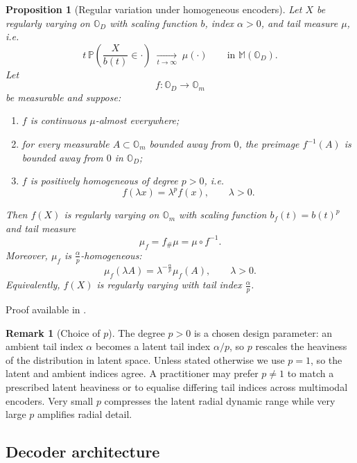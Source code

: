 \documentclass{article}
\newtheorem{proposition}[theorem]{Proposition}
\theoremstyle{definition}
\newtheorem{remark}[theorem]{Remark}
\begin{document}
\begin{proposition}[Regular variation under homogeneous encoders]
\label{prop:reg-variation-under-homogeneous-encoders}
Let \(X\) be regularly varying on \(\mathbb{O}_D\) with scaling function \(b\), index \(\alpha>0\), and tail measure \(\mu\), i.e.
\[
t\,\mathbb{P}\!\left(\frac{X}{b(t)} \in \cdot \right)
\;\xrightarrow[t\to\infty]{}\;
\mu(\cdot)
\qquad
\text{in } \mathbb{M}(\mathbb{O}_D).
\]
Let
\[
f:\mathbb{O}_D \to \mathbb{O}_m
\]
be measurable and suppose:
\begin{enumerate}
    \item \(f\) is continuous \(\mu\)-almost everywhere;
    \item for every measurable \(A \subset \mathbb{O}_m\) bounded away from \(0\), the preimage \(f^{-1}(A)\) is bounded away from \(0\) in \(\mathbb{O}_D\);
    \item \(f\) is positively homogeneous of degree \(p>0\), i.e.
    \[
    f(\lambda x)=\lambda^p f(x),
    \qquad \lambda>0.
    \]
\end{enumerate}
Then \(f(X)\) is regularly varying on \(\mathbb{O}_m\) with scaling function \(b_f(t)=b(t)^p\) and tail measure
\[
\mu_f = f_{\#}\mu = \mu\circ f^{-1}.
\]
Moreover, \(\mu_f\) is \(\frac{\alpha}{p}\)-homogeneous:
\[
\mu_f(\lambda A)=\lambda^{-\frac{\alpha}{p}}\mu_f(A),
\qquad
\lambda>0.
\]
Equivalently, \(f(X)\) is regularly varying with tail index \(\frac{\alpha}{p}\).
\end{proposition}

Proof available in
.


\begin{remark}[Choice of \(p\)]
\label{rmk:choice-of-p}
The degree \(p>0\) is a chosen design parameter: an ambient tail index \(\alpha\) becomes a latent tail index \(\alpha/p\), so \(p\)  rescales the heaviness of the distribution in latent space. Unless stated otherwise we use \(p=1\), so the latent and ambient indices agree. A practitioner may prefer \(p\neq 1\) to match a prescribed latent heaviness or to equalise differing tail indices across multimodal encoders. Very small \(p\) compresses the latent radial dynamic range while very large \(p\) amplifies radial detail.
\end{remark}

\subsection{Decoder architecture}
\label{sec:decoder-architecture}
\end{document}
